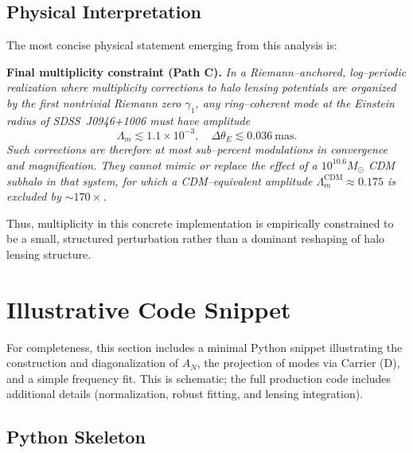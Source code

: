 \documentclass[11pt]{article}
\begin{document}
\subsection{Physical Interpretation}

The most concise physical statement emerging from this analysis is:

\medskip
\noindent\textbf{Final multiplicity constraint (Path C).}
\emph{
In a Riemann--anchored, log--periodic realization where multiplicity corrections to halo lensing potentials are organized by the first nontrivial Riemann zero $\gamma_1$, any ring--coherent mode at the Einstein radius of SDSS~J0946+1006 must have amplitude
\[
\Lambda_m \lesssim 1.1\times 10^{-3},
\quad
\Delta\theta_E \lesssim 0.036~\mathrm{mas}.
\]
Such corrections are therefore at most sub--percent modulations in convergence and magnification. They cannot mimic or replace the effect of a $10^{10.6}M_\odot$ CDM subhalo in that system, for which a CDM--equivalent amplitude $\Lambda_m^{\text{CDM}} \approx 0.175$ is excluded by $\sim 170\times$.
}
\medskip

Thus, multiplicity in this concrete implementation is empirically constrained to be a small, structured perturbation rather than a dominant reshaping of halo lensing structure.

\section{Illustrative Code Snippet}

For completeness, this section includes a minimal Python snippet illustrating the construction and diagonalization of $A_N$, the projection of modes via Carrier (D), and a simple frequency fit. This is schematic; the full production code includes additional details (normalization, robust fitting, and lensing integration).

\subsection*{Python Skeleton}
\end{document}
